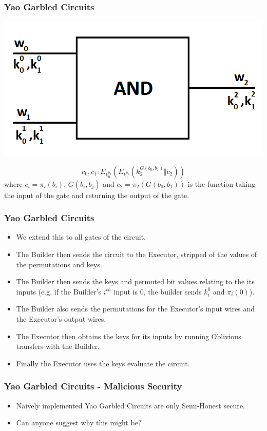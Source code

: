 \documentclass{beamer}
\begin{document}
	\begin{frame}
		\frametitle{Yao Garbled Circuits}
		\centering
		\includegraphics[scale=0.4]{Images/BasicGarbling}

		$$c_0, c_1 : E_{k_0^{b_0}}(E_{k_1^{b_1}}(k_2^{G(b_0, b_1)} \Vert c_2))$$
		where $c_i = \pi_i(b_i)$, $G(b_i, b_j)$ and $c_2 = \pi_2(G(b_0, b_1))$ is the function taking the input of the gate and returning the output of the gate.
	\end{frame}

	\begin{frame}
		\frametitle{Yao Garbled Circuits}
		\begin{itemize}
			\item We extend this to all gates of the circuit.
			\item The Builder then sends the circuit to the Executor, stripped of the values of the permutations and keys.
			\item The Builder then sends the keys and permuted bit values relating to the its inputs (e.g. if the Builder's $i^{th}$ input is $0$, the builder sends $k_i^0$ and $\pi_i(0)$).
			\item The Builder also sends the permutations for the Executor's input wires and the Executor's output wires.
			\item The Executor then obtains the keys for its inputs by running Oblivious transfers with the Builder.
			\item Finally the Executor uses the keys evaluate the circuit.
		\end{itemize}
	\end{frame}

	
	\begin{frame}
		\frametitle{Yao Garbled Circuits - Malicious Security}
		\begin{itemize}
			\item Naively implemented Yao Garbled Circuits are only Semi-Honest secure.
			\item Can anyone suggest why this might be?
		\end{itemize}
	\end{frame}
\end{document}
